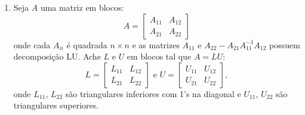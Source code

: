 \documentclass[leqno]{article}
\numberwithin{equation}{section}
\begin{document}
\begin{enumerate}
            \item Seja $A$ uma matriz em blocos:
                $$A = \begin{bmatrix}
                    A_{11} & A_{12}\\
                    A_{21} & A_{22}
                \end{bmatrix}$$
                onde cada $A_{ii}$ é quadrada $n \times n$ e as matrizes $A_{11}$ e \( A_{ 22 } - A_{ 21 } A_{ 11 }^{ -1 } A_{ 12 } \) possuem decomposição LU.
                Ache $L$ e $U$ em blocos tal que $A = LU$:
                $$L = \begin{bmatrix}
                    L_{11} & L_{12}\\
                    L_{21} & L_{22}
                    \end{bmatrix} \mbox{ e } U = \begin{bmatrix}
                    U_{11} & U_{12}\\
                    U_{21} & U_{22}
                \end{bmatrix},$$
                onde $L_{11}$, $L_{22}$ são triangulares inferiores com 1's na diagonal e $U_{11}$, $U_{22}$ são triangulares superiores.
        \end{enumerate}
\end{document}
